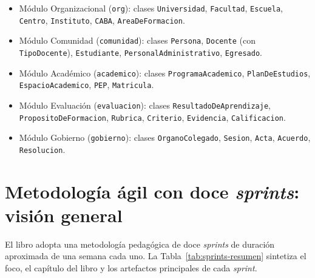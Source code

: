\begin{itemize}
  \item Módulo Organizacional (\texttt{org}): clases \texttt{Universidad},
    \texttt{Facultad}, \texttt{Escuela}, \texttt{Centro}, \texttt{Instituto},
    \texttt{CABA}, \texttt{AreaDeFormacion}.
  \item Módulo Comunidad (\texttt{comunidad}): clases \texttt{Persona},
    \texttt{Docente} (con \texttt{TipoDocente}), \texttt{Estudiante},
    \texttt{PersonalAdministrativo}, \texttt{Egresado}.
  \item Módulo Académico (\texttt{academico}): clases \texttt{ProgramaAcademico},
    \texttt{PlanDeEstudios}, \texttt{EspacioAcademico},
    \texttt{PEP}, \texttt{Matricula}.
  \item Módulo Evaluación (\texttt{evaluacion}): clases
    \texttt{ResultadoDeAprendizaje}, \texttt{PropositoDeFormacion},
    \texttt{Rubrica}, \texttt{Criterio}, \texttt{Evidencia},
    \texttt{Calificacion}.
  \item Módulo Gobierno (\texttt{gobierno}): clases
    \texttt{OrganoColegado}, \texttt{Sesion}, \texttt{Acta},
    \texttt{Acuerdo}, \texttt{Resolucion}.
\end{itemize}

\section{Metodología ágil con doce \textit{sprints}: visión general}
\label{sec:sprints-vision}

El libro adopta una metodología pedagógica de doce \textit{sprints} de
duración aproximada de una semana cada uno. La Tabla~\ref{tab:sprints-resumen}
sintetiza el foco, el capítulo del libro y los artefactos principales de
cada \textit{sprint}.

